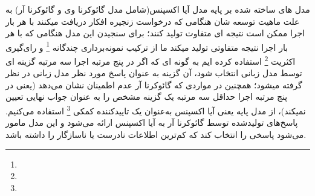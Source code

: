 مدل های ساخته شده بر پایه مدل آیا اکسپنس(شامل مدل گائوکرنا وی و گائوکرنا آر) به علت ماهیت توسعه شان هنگامی که درخواست زنجیره افکار دریافت میکنند با هر بار اجرا ممکن است نتیجه ای متفاوت تولید کنند؛ برای سنجیدن این مدل هنگامی که با هر بار اجرا نتیجه متفاوتی تولید میکند ما از ترکیب نمونه‌برداری چندگانه 
\footnote{}
و رای‌گیری اکثریت
\footnote{}
استفاده کرده ایم به گونه ای که اگر در پنج مرتبه اجرا سه مرتبه گزینه ای توسط مدل زبانی انتخاب شود، آن گزینه به عنوان پاسخ مورد نظر مدل زبانی در نظر گرفته میشود؛ همچنین در مواردی که گائوکرنا آر عدم اطمینان نشان می‌دهد (یعنی در پنج مرتبه اجرا حداقل سه مرتبه یک گزینه مشخص را به عنوان جواب نهایی تعیین نمیکند)، از مدل پایه یعنی آیا اکسپنس به‌عنوان یک تاییدکننده کمکی
\footnote{}
استفاده می‌کنیم. پاسخ‌های تولیدشده توسط گائوکرنا آر
به آیا اکسپنس ارائه می‌شود و این مدل مامور می‌شود پاسخی را انتخاب کند که کم‌ترین اطلاعات نادرست یا ناسازگار را داشته باشد.


